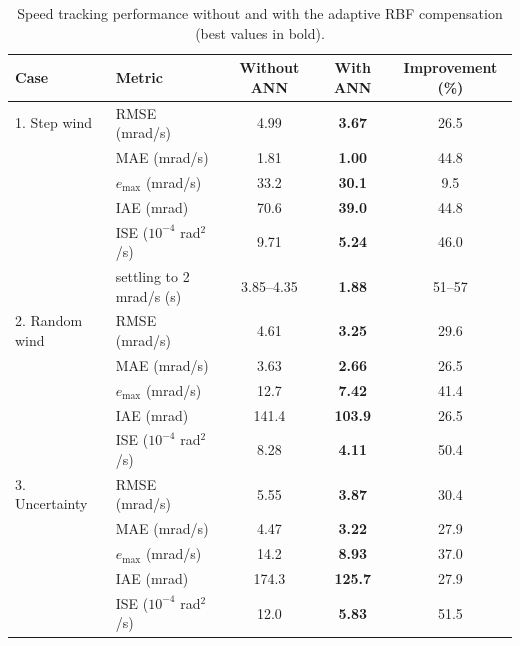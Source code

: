 \documentclass[11pt,a4paper]{article}
\begin{document}
\begin{table}[!htb]
\caption{Speed tracking performance without and with the adaptive RBF compensation (best values in bold).}
\label{tab:speed}
\centering
\setlength{\tabcolsep}{5pt}
\begin{tabular}{llccc}
\toprule
Case & Metric & Without ANN & With ANN & Improvement (\%)\\
\midrule
1. Step wind & RMSE (mrad/s) & 4.99 & \textbf{3.67} & 26.5\\
 & MAE (mrad/s) & 1.81 & \textbf{1.00} & 44.8\\
 & $e_{\max}$ (mrad/s) & 33.2 & \textbf{30.1} & 9.5\\
 & IAE (mrad) & 70.6 & \textbf{39.0} & 44.8\\
 & ISE ($10^{-4}$ rad$^2$/s) & 9.71 & \textbf{5.24} & 46.0\\
 & settling to 2 mrad/s (s) & 3.85--4.35 & \textbf{1.88} & 51--57\\
\midrule
2. Random wind & RMSE (mrad/s) & 4.61 & \textbf{3.25} & 29.6\\
 & MAE (mrad/s) & 3.63 & \textbf{2.66} & 26.5\\
 & $e_{\max}$ (mrad/s) & 12.7 & \textbf{7.42} & 41.4\\
 & IAE (mrad) & 141.4 & \textbf{103.9} & 26.5\\
 & ISE ($10^{-4}$ rad$^2$/s) & 8.28 & \textbf{4.11} & 50.4\\
\midrule
3. Uncertainty & RMSE (mrad/s) & 5.55 & \textbf{3.87} & 30.4\\
 & MAE (mrad/s) & 4.47 & \textbf{3.22} & 27.9\\
 & $e_{\max}$ (mrad/s) & 14.2 & \textbf{8.93} & 37.0\\
 & IAE (mrad) & 174.3 & \textbf{125.7} & 27.9\\
 & ISE ($10^{-4}$ rad$^2$/s) & 12.0 & \textbf{5.83} & 51.5\\
\bottomrule
\end{tabular}
\end{table}
\end{document}
